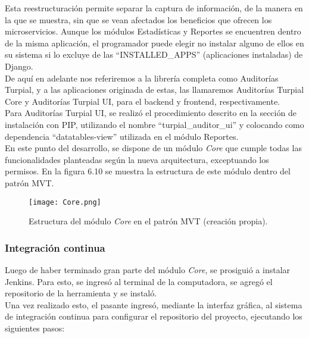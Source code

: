 Esta reestructuración permite separar la captura de información, de la manera en la que se muestra, sin que se vean afectados los beneficios que ofrecen los microservicios. Aunque los módulos Estadísticas y Reportes se encuentren dentro de la misma aplicación, el programador puede elegir no instalar alguno de ellos en su sistema si lo excluye de las “INSTALLED\_APPS” (aplicaciones instaladas) de Django.\\

De aquí en adelante nos referiremos a la librería completa como Auditorías Turpial, y a las aplicaciones originada de estas, las llamaremos Auditorías Turpial Core y Auditorías Turpial UI, para el backend y frontend, respectivamente.\\

Para Auditorías Turpial UI, se realizó el procedimiento descrito en la sección de instalación con PIP, utilizando el nombre “turpial_auditor_ui” y colocando como dependencia “datatables-view” utilizada en el módulo Reportes.\\

En este punto del desarrollo, se dispone de un módulo \textit{Core} que cumple todas las funcionalidades planteadas según la nueva arquitectura, exceptuando los permisos. En la figura 6.10 se muestra la estructura de este módulo dentro del patrón MVT.

\begin{figure}[h]
\centering
\texttt{[image: Core.png]}
\caption{Estructura del módulo \textit{Core} en el patrón MVT (creación propia).}
\label{fig:figura6.6}
\end{figure}

\subsubsection{Integración continua}

Luego de haber terminado gran parte del módulo \textit{Core}, se prosiguió a instalar Jenkins. Para esto, se ingresó al terminal de la computadora, se agregó el repositorio de la herramienta y se instaló.\\

Una vez realizado esto, el pasante ingresó, mediante la interfaz gráfica, al sistema de integración continua para configurar el repositorio del proyecto, ejecutando los siguientes pasos:

